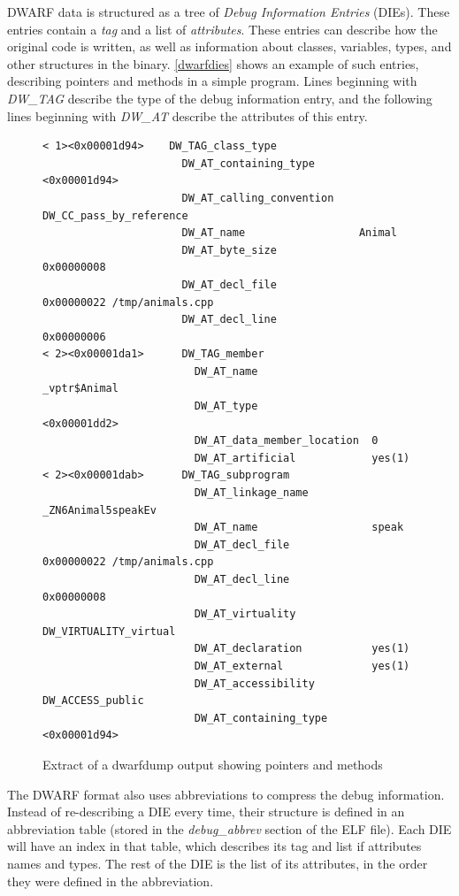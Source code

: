 \documentclass[a4paper,11pt,oneside]{report}
\begin{document}
DWARF data is structured as a tree of \emph{Debug Information Entries} 
(DIEs). These entries contain a \emph{tag} and a list of
\emph{attributes}.
These entries can describe how the original code is written, as well as
information about classes, variables, types, and other structures in the
binary. \autoref{dwarfdies} shows an example of such entries, describing
pointers and methods in a simple program. Lines beginning with \emph{DW\_TAG}
describe the type of the debug information entry, and the following lines
beginning with \emph{DW\_AT} describe the attributes of this entry.

\begin{figure}
\begin{lstlisting}
< 1><0x00001d94>    DW_TAG_class_type
                      DW_AT_containing_type       <0x00001d94>
                      DW_AT_calling_convention    DW_CC_pass_by_reference
                      DW_AT_name                  Animal
                      DW_AT_byte_size             0x00000008
                      DW_AT_decl_file             0x00000022 /tmp/animals.cpp
                      DW_AT_decl_line             0x00000006
< 2><0x00001da1>      DW_TAG_member
                        DW_AT_name                  _vptr$Animal
                        DW_AT_type                  <0x00001dd2>
                        DW_AT_data_member_location  0
                        DW_AT_artificial            yes(1)
< 2><0x00001dab>      DW_TAG_subprogram
                        DW_AT_linkage_name          _ZN6Animal5speakEv
                        DW_AT_name                  speak
                        DW_AT_decl_file             0x00000022 /tmp/animals.cpp
                        DW_AT_decl_line             0x00000008
                        DW_AT_virtuality            DW_VIRTUALITY_virtual
                        DW_AT_declaration           yes(1)
                        DW_AT_external              yes(1)
                        DW_AT_accessibility         DW_ACCESS_public
                        DW_AT_containing_type       <0x00001d94>
\end{lstlisting}
\caption{Extract of a dwarfdump output showing pointers and methods}
\label{dwarfdies}
\end{figure}

The DWARF format also uses abbreviations to compress the debug information.
Instead of re-describing a DIE every time, their structure is defined in an
abbreviation table (stored in the \emph{debug\_abbrev} section of the ELF
file).
Each DIE will have an index in that table, which describes its tag and list
if attributes names and types. The rest of the DIE is the list of its
attributes, in the order they were defined in the abbreviation.
\end{document}
